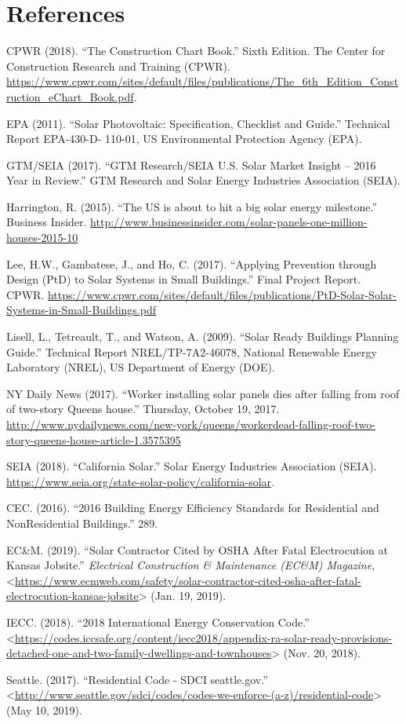 \documentclass[]{article}
\begin{document}
\hypertarget{references}{%
\section{References}\label{references}}

CPWR (2018). ``The Construction Chart Book.'' Sixth Edition. The Center
for Construction Research and Training (CPWR).
\url{https://www.cpwr.com/sites/default/files/publications/The_6th_Edition_Construction_eChart_Book.pdf}.

EPA (2011). ``Solar Photovoltaic: Specification, Checklist and Guide.''
Technical Report EPA-430-D- 110-01, US Environmental Protection Agency
(EPA).

GTM/SEIA (2017). ``GTM Research/SEIA U.S. Solar Market Insight -- 2016
Year in Review.'' GTM Research and Solar Energy Industries Association
(SEIA).

Harrington, R. (2015). ``The US is about to hit a big solar energy
milestone.'' Business Insider.
\url{http://www.businessinsider.com/solar-panels-one-million-houses-2015-10}

Lee, H.W., Gambatese, J., and Ho, C. (2017). ``Applying Prevention
through Design (PtD) to Solar Systems in Small Buildings.'' Final
Project Report. CPWR.
\url{https://www.cpwr.com/sites/default/files/publications/PtD-Solar-Solar-Systems-in-Small-Buildings.pdf}

Lisell, L., Tetreault, T., and Watson, A. (2009). ``Solar Ready
Buildings Planning Guide.'' Technical Report NREL/TP-7A2-46078, National
Renewable Energy Laboratory (NREL), US Department of Energy (DOE).

NY Daily News (2017). ``Worker installing solar panels dies after
falling from roof of two-story Queens house.'' Thursday, October 19,
2017.
\url{http://www.nydailynews.com/new-york/queens/workerdead-falling-roof-two-story-queens-house-article-1.3575395}

SEIA (2018). ``California Solar.'' Solar Energy Industries Association
(SEIA). \url{https://www.seia.org/state-solar-policy/california-solar}.

\hypertarget{refs}{}
\leavevmode\hypertarget{ref-cec2016BuildingEnergy2016}{}%
CEC. (2016). ``2016 Building Energy Efficiency Standards for Residential
and NonResidential Buildings.'' 289.

\leavevmode\hypertarget{ref-ecmSolarContractorCited2019}{}%
EC\&M. (2019). ``Solar Contractor Cited by OSHA After Fatal
Electrocution at Kansas Jobsite.'' \emph{Electrical Construction \&
Maintenance (EC\&M) Magazine},
\textless{}\url{https://www.ecmweb.com/safety/solar-contractor-cited-osha-after-fatal-electrocution-kansas-jobsite}\textgreater{}
(Jan. 19, 2019).

\leavevmode\hypertarget{ref-iecc2018InternationalEnergy2018}{}%
IECC. (2018). ``2018 International Energy Conservation Code.''
\textless{}\url{https://codes.iccsafe.org/content/iecc2018/appendix-ra-solar-ready-provisions-detached-one-and-two-family-dwellings-and-townhouses}\textgreater{}
(Nov. 20, 2018).

\leavevmode\hypertarget{ref-seattleResidentialCodeSDCI2017}{}%
Seattle. (2017). ``Residential Code - SDCI \textbar{} seattle.gov.''
\textless{}\url{http://www.seattle.gov/sdci/codes/codes-we-enforce-(a-z)/residential-code}\textgreater{}
(May 10, 2019).
\end{document}
